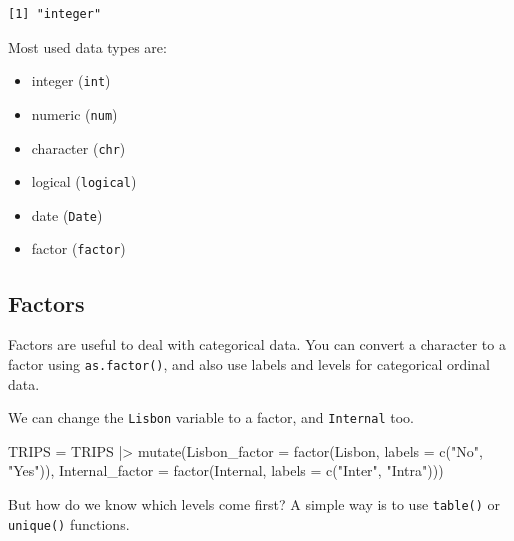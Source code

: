 \documentclass[
  letterpaper,
  DIV=11,
  numbers=noendperiod]{scrreprt}
\newenvironment{Shaded}{\begin{snugshade}}{\end{snugshade}}
\newcommand{\AttributeTok}[1]{\textcolor[rgb]{0.40,0.45,0.13}{#1}}
\newcommand{\CommentTok}[1]{\textcolor[rgb]{0.37,0.37,0.37}{#1}}
\newcommand{\FunctionTok}[1]{\textcolor[rgb]{0.28,0.35,0.67}{#1}}
\newcommand{\NormalTok}[1]{\textcolor[rgb]{0.00,0.23,0.31}{#1}}
\newcommand{\OtherTok}[1]{\textcolor[rgb]{0.00,0.23,0.31}{#1}}
\newcommand{\SpecialCharTok}[1]{\textcolor[rgb]{0.37,0.37,0.37}{#1}}
\newcommand{\StringTok}[1]{\textcolor[rgb]{0.13,0.47,0.30}{#1}}
\providecommand{\tightlist}{%
  \setlength{\itemsep}{0pt}\setlength{\parskip}{0pt}}\usepackage{longtable,booktabs,array}
\begin{document}
\begin{verbatim}
[1] "integer"
\end{verbatim}

Most used data types are:

\begin{itemize}
\tightlist
\item
  integer (\texttt{int})
\item
  numeric (\texttt{num})
\item
  character (\texttt{chr})
\item
  logical (\texttt{logical})
\item
  date (\texttt{Date})
\item
  factor (\texttt{factor})
\end{itemize}

\subsection{Factors}\label{factors}

Factors are useful to deal with categorical data. You can convert a
character to a factor using \texttt{as.factor()}, and also use labels
and levels for categorical ordinal data.

We can change the \texttt{Lisbon} variable to a factor, and
\texttt{Internal} too.

\begin{Shaded}
\begin{Highlighting}[]
\NormalTok{TRIPS }\OtherTok{=}\NormalTok{ TRIPS }\SpecialCharTok{|\textgreater{}} 
  \FunctionTok{mutate}\NormalTok{(}\AttributeTok{Lisbon\_factor =} \FunctionTok{factor}\NormalTok{(Lisbon, }\AttributeTok{labels =} \FunctionTok{c}\NormalTok{(}\StringTok{"No"}\NormalTok{, }\StringTok{"Yes"}\NormalTok{)),}
         \AttributeTok{Internal\_factor =} \FunctionTok{factor}\NormalTok{(Internal, }\AttributeTok{labels =} \FunctionTok{c}\NormalTok{(}\StringTok{"Inter"}\NormalTok{, }\StringTok{"Intra"}\NormalTok{)))}
\end{Highlighting}
\end{Shaded}

But how do we know which levels come first? A simple way is to use
\texttt{table()} or \texttt{unique()} functions.

\begin{Shaded}
\end{Shaded}
\end{document}
